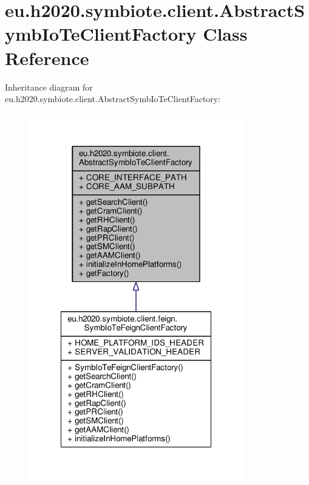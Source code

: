 \hypertarget{classeu_1_1h2020_1_1symbiote_1_1client_1_1AbstractSymbIoTeClientFactory}{}\section{eu.\+h2020.\+symbiote.\+client.\+Abstract\+Symb\+Io\+Te\+Client\+Factory Class Reference}
\label{classeu_1_1h2020_1_1symbiote_1_1client_1_1AbstractSymbIoTeClientFactory}


Inheritance diagram for eu.\+h2020.\+symbiote.\+client.\+Abstract\+Symb\+Io\+Te\+Client\+Factory\+:
\nopagebreak
\begin{figure}[H]
\begin{center}
\leavevmode
\includegraphics[width=264pt]{classeu_1_1h2020_1_1symbiote_1_1client_1_1AbstractSymbIoTeClientFactory__inherit__graph}
\end{center}
\end{figure}


